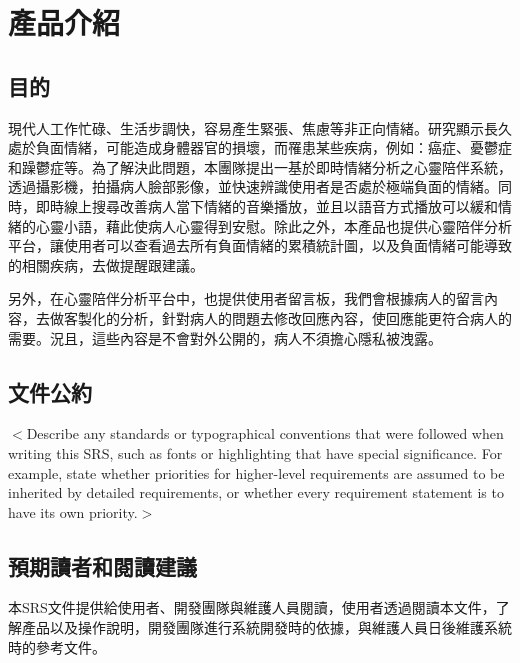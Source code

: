 \documentclass[12pt]{scrreprt}
\begin{document}
\chapter{產品介紹}

\section{目的}

現代人工作忙碌、生活步調快，容易產生緊張、焦慮等非正向情緒。研究顯示長久處於負面情緒，可能造成身體器官的損壞，而罹患某些疾病，例如：癌症、憂鬱症和躁鬱症等。為了解決此問題，本團隊提出一基於即時情緒分析之心靈陪伴系統，透過攝影機，拍攝病人臉部影像，並快速辨識使用者是否處於極端負面的情緒。同時，即時線上搜尋改善病人當下情緒的音樂播放，並且以語音方式播放可以緩和情緒的心靈小語，藉此使病人心靈得到安慰。除此之外，本產品也提供心靈陪伴分析平台，讓使用者可以查看過去所有負面情緒的累積統計圖，以及負面情緒可能導致的相關疾病，去做提醒跟建議。

另外，在心靈陪伴分析平台中，也提供使用者留言板，我們會根據病人的留言內容，去做客製化的分析，針對病人的問題去修改回應內容，使回應能更符合病人的需要。況且，這些內容是不會對外公開的，病人不須擔心隱私被洩露。

\section{文件公約} %
$<$Describe any standards or typographical conventions that were followed when 
writing this SRS, such as fonts or highlighting that have special significance.  
For example, state whether priorities  for higher-level requirements are assumed 
to be inherited by detailed requirements, or whether every requirement statement 
is to have its own priority.$>$

\section{預期讀者和閱讀建議}

本SRS文件提供給使用者、開發團隊與維護人員閱讀，使用者透過閱讀本文件，了解產品以及操作說明，開發團隊進行系統開發時的依據，與維護人員日後維護系統時的參考文件。 \\
\end{document}
